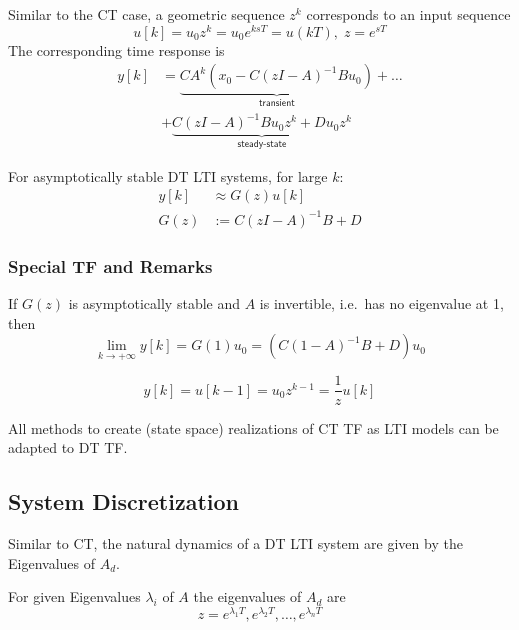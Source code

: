 Similar to the CT case, a geometric sequence $z^k$ corresponds to an input sequence
\begin{equation*}
    u[k] =u_0z^k=u_0e^{ksT}=u(kT), \; z=e^{sT}
\end{equation*}
The corresponding time response is
\begin{align*}
    y[k] & = \underbrace{CA^k(x_0-C{(zI-A)}^{-1}Bu_0)}_{\textsf{transient}}+\dots \\
         & +\underbrace{C{(zI-A)}^{-1}Bu_0z^k+Du_0z^k}_{\textsf{steady-state}}
\end{align*}


For asymptotically stable DT LTI systems, for large $k$:
\begin{align*}
    y[k] & \approx G(z)u[k]    \\
    G(z) & :=C{(zI-A)}^{-1}B+D
\end{align*}
\subsubsection{Special TF and Remarks}

If $G(z)$ is asymptotically stable and $A$ is invertible, i.e.\ has no eigenvalue at 1, then
\begin{equation*}
    \lim_{k\to+\infty}y[k]=G(1)u_0=(C{(1-A)}^{-1}B+D)u_0
\end{equation*}


\begin{equation*}
    y[k] =u[k-1] =u_0z^{k-1}=\frac1zu[k]
\end{equation*}


All methods to create (state space) realizations of CT TF as LTI models can be adapted to DT TF.


\subsection{System Discretization}

Similar to CT, the natural dynamics of a DT LTI system are given by the Eigenvalues of $A_d$.

For given Eigenvalues $\lambda_i$ of $A$ the eigenvalues of $A_d$ are
\begin{equation*}
    z=e^{\lambda_1T},e^{\lambda_2T},\ldots,e^{\lambda_{n}T}
\end{equation*}


